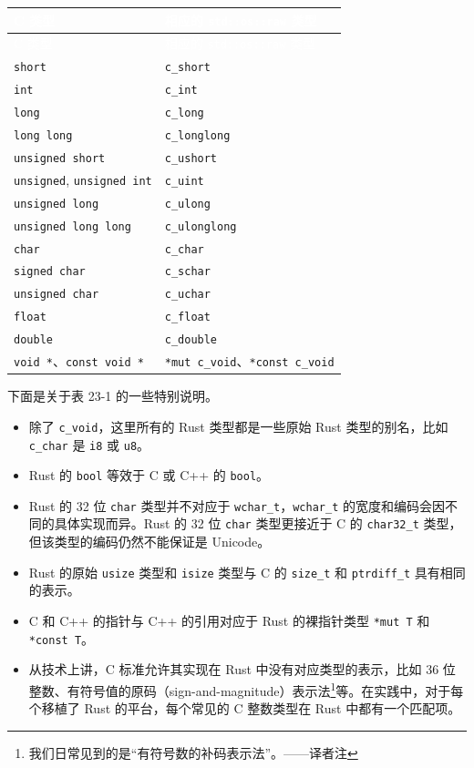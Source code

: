 
\myTableBegin
\begin{xltabular}{\textwidth}{@{}>{\hsize\raggedright\arraybackslash}X>{\hsize\raggedright\arraybackslash}X@{}}
\textcolor{white}{C 类型} & \textcolor{white}{相应的 \texttt{std::os::raw} 类型} \\
\endfirsthead
{}\textcolor{white}{C 类型} & \textcolor{white}{相应的 \texttt{std::os::raw} 类型} \\
\endhead
\texttt{short} & \texttt{c\_short} \\
\texttt{int} & \texttt{c\_int} \\
\texttt{long} & \texttt{c\_long} \\
\texttt{long long} & \texttt{c\_longlong} \\
\texttt{unsigned short} & \texttt{c\_ushort} \\
\texttt{unsigned}, \texttt{unsigned int} & \texttt{c\_uint} \\
\texttt{unsigned long} & \texttt{c\_ulong} \\
\texttt{unsigned long long} & \texttt{c\_ulonglong} \\
\texttt{char} & \texttt{c\_char} \\
\texttt{signed char} & \texttt{c\_schar} \\
\texttt{unsigned char} & \texttt{c\_uchar} \\
\texttt{float} & \texttt{c\_float} \\
\texttt{double} & \texttt{c\_double} \\
\texttt{void *}、\texttt{const void *} & \texttt{*mut c\_void}、\texttt{*const c\_void} \\
\end{xltabular}
\myTableEnd

下面是关于表 23-1 的一些特别说明。

\begin{itemize}
\item 除了 \texttt{c\_void}，这里所有的 Rust 类型都是一些原始 Rust 类型的别名，比如 \texttt{c\_char} 是 \texttt{i8} 或 \texttt{u8}。
\item Rust 的 \texttt{bool} 等效于 C 或 C++ 的 \texttt{bool}。
\item Rust 的 32 位 \texttt{char} 类型并不对应于 \texttt{wchar\_t}，\texttt{wchar\_t} 的宽度和编码会因不同的具体实现而异。Rust 的 32 位 \texttt{char} 类型更接近于 C 的 \texttt{char32\_t} 类型，但该类型的编码仍然不能保证是 Unicode。
\item Rust 的原始 \texttt{usize} 类型和 \texttt{isize} 类型与 C 的 \texttt{size\_t} 和 \texttt{ptrdiff\_t} 具有相同的表示。
\item C 和 C++ 的指针与 C++ 的引用对应于 Rust 的裸指针类型 \texttt{*mut T} 和 \texttt{*const T}。
\item 从技术上讲，C 标准允许其实现在 Rust 中没有对应类型的表示，比如 36 位整数、有符号值的原码（sign-and-magnitude）表示法\footnote{我们日常见到的是“有符号数的补码表示法”。——译者注}等。在实践中，对于每个移植了 Rust 的平台，每个常见的 C 整数类型在 Rust 中都有一个匹配项。
\end{itemize}

